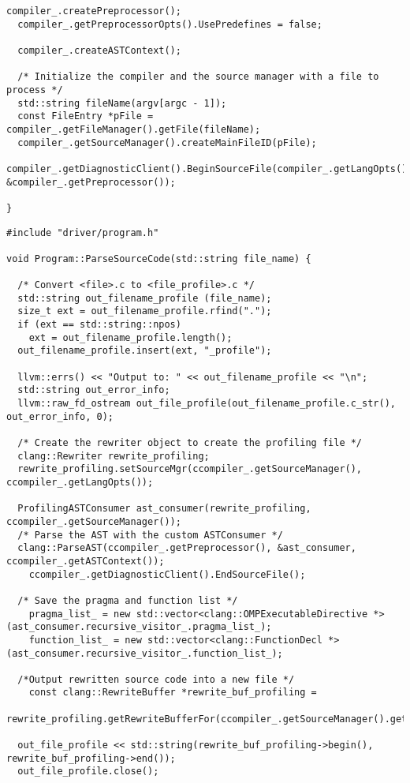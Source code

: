 \documentclass[a4paper,11pt,twoside]{book}
\begin{document}
\begin{lstlisting}[language=CCC, caption=driver/compiler.cpp]
  compiler_.createPreprocessor();
  compiler_.getPreprocessorOpts().UsePredefines = false;

  compiler_.createASTContext();

  /* Initialize the compiler and the source manager with a file to process */
  std::string fileName(argv[argc - 1]);  
  const FileEntry *pFile = compiler_.getFileManager().getFile(fileName);
  compiler_.getSourceManager().createMainFileID(pFile);
  compiler_.getDiagnosticClient().BeginSourceFile(compiler_.getLangOpts(), &compiler_.getPreprocessor());

}
\end{lstlisting}

\begin{lstlisting}[language=CCC, caption=driver/program.cpp]
#include "driver/program.h"

void Program::ParseSourceCode(std::string file_name) {

  /* Convert <file>.c to <file_profile>.c */
  std::string out_filename_profile (file_name);
  size_t ext = out_filename_profile.rfind(".");
  if (ext == std::string::npos)
  	ext = out_filename_profile.length();
  out_filename_profile.insert(ext, "_profile");

  llvm::errs() << "Output to: " << out_filename_profile << "\n";
  std::string out_error_info;
  llvm::raw_fd_ostream out_file_profile(out_filename_profile.c_str(), out_error_info, 0);

  /* Create the rewriter object to create the profiling file */
  clang::Rewriter rewrite_profiling;
  rewrite_profiling.setSourceMgr(ccompiler_.getSourceManager(), ccompiler_.getLangOpts());
  
  ProfilingASTConsumer ast_consumer(rewrite_profiling, ccompiler_.getSourceManager());
  /* Parse the AST with the custom ASTConsumer */
  clang::ParseAST(ccompiler_.getPreprocessor(), &ast_consumer, ccompiler_.getASTContext());
	ccompiler_.getDiagnosticClient().EndSourceFile();

  /* Save the pragma and function list */
	pragma_list_ = new std::vector<clang::OMPExecutableDirective *>(ast_consumer.recursive_visitor_.pragma_list_);
	function_list_ = new std::vector<clang::FunctionDecl *>(ast_consumer.recursive_visitor_.function_list_);

  /*Output rewritten source code into a new file */
	const clang::RewriteBuffer *rewrite_buf_profiling = 
      rewrite_profiling.getRewriteBufferFor(ccompiler_.getSourceManager().getMainFileID());  	
  
  out_file_profile << std::string(rewrite_buf_profiling->begin(), rewrite_buf_profiling->end());
  out_file_profile.close();


\end{lstlisting}
\end{document}
